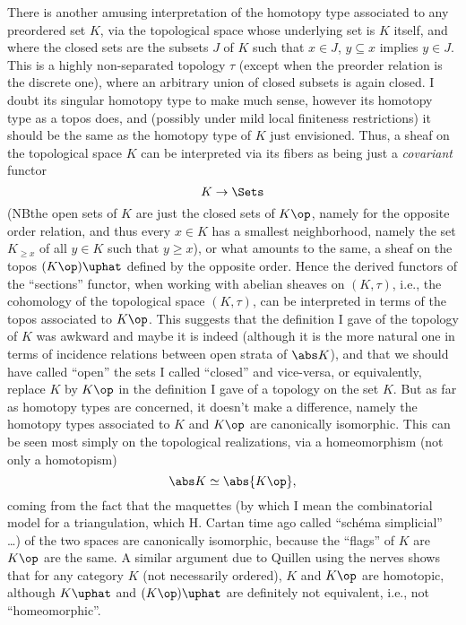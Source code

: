There is another amusing interpretation of the homotopy
type associated to any preordered set $K$, via the topological space
whose underlying set is $K$ itself, and where the closed sets are the
subsets $J$ of $K$ such that $x\in J$, $y\subseteq x$ implies $y\in
J$. This is a highly non-separated topology $\tau$ (except when the
preorder relation is the discrete one), where an arbitrary union of
closed subsets is again closed. I doubt its singular homotopy type to
make much sense, however its homotopy type as a topos does, and
(possibly under mild local finiteness restrictions) it should be the
same as the homotopy type of $K$ just envisioned. Thus, a sheaf on the
topological space $K$ can be interpreted via its fibers as being just
a \emph{covariant} functor
\[ K \to \Sets \]
(NB\enspace the open sets of $K$ are just the closed sets of $K\op$, namely
for the opposite order relation, and thus every $x\in K$ has a
smallest neighborhood, namely the set $K_{\ge x}$ of all $y\in K$ such
that $y\ge x$), or what amounts to the same, a sheaf on the topos
$(K\op)\uphat$ defined by the opposite order. Hence the derived
functors of the ``sections'' functor, when working with abelian
sheaves on $(K,\tau)$, i.e., the cohomology of the topological space
$(K,\tau)$, can be interpreted in terms of the topos associated to
$K\op$. This suggests that the definition I gave of the topology of
$K$ was awkward and maybe it is indeed (although it is the more
natural one in terms of incidence relations between open strata of
$\abs K$), and that we should have called ``open'' the sets I called
``closed'' and vice-versa, or equivalently, replace $K$ by $K\op$ in
the definition I gave of a topology on the set $K$. But as far as
homotopy types are concerned, it doesn't make a difference, namely the
homotopy types associated to $K$ and $K\op$ are canonically
isomorphic. This can be seen most simply on the topological
realizations, via a homeomorphism (not only a homotopism)
\[ \abs K \simeq \abs{K\op},\]
coming from the fact that the maquettes (by which I mean the
combinatorial model for a triangulation, which H. Cartan time ago called
``sch\'ema simplicial'' \ldots) of the two spaces are canonically
isomorphic, because the ``flags'' of $K$ are $K\op$ are the same. A
similar argument due to Quillen using the nerves shows that for any
category $K$ (not necessarily ordered), $K$ and $K\op$ are homotopic,
although $K\uphat$ and $(K\op)\uphat$ are definitely not
equivalent, i.e., not ``homeomorphic''.

